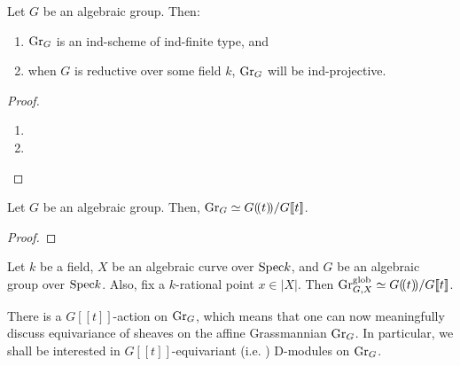                     \begin{proposition} \label{prop: structure_of_affine_grasmannian}
                        Let $G$ be an algebraic group. Then:
                            \begin{enumerate}
                                \item $\mathrm{Gr}_G$ is an ind-scheme of ind-finite type, and
                                \item when $G$ is reductive over some field $k$, $\mathrm{Gr}_G$ will be ind-projective.
                            \end{enumerate}
                    \end{proposition}
                        \begin{proof}
                            \noindent
                            \begin{enumerate}
                                \item 
                                \item 
                            \end{enumerate}
                        \end{proof}
                        
                    \begin{proposition} \label{prop: affine_grassmannians_as_coset_spaces}
                        Let $G$ be an algebraic group. Then, $\mathrm{Gr}_G \simeq G(\!(t)\!)/G[\![t]\!]$.
                    \end{proposition}
                        \begin{proof}
                            
                        \end{proof}
                    \begin{corollary}
                        Let $k$ be a field, $X$ be an algebraic curve over $\mathrm{Spec} k$, and $G$ be an algebraic group over $\mathrm{Spec} k$. Also, fix a $k$-rational point $x \in |X|$. Then $\mathrm{Gr}_{G, X}^{\mathrm{glob}} \simeq G(\!(t)\!)/G[\![t]\!]$.
                    \end{corollary}
                    \begin{corollary} \label{coro: loop_group_action_on_grassmannians}
                        There is a $G[\![t]\!]$-action on $\mathrm{Gr}_G$, which means that one can now meaningfully discuss equivariance of sheaves on the affine Grassmannian $\mathrm{Gr}_G$. In particular, we shall be interested in $G[\![t]\!]$-equivariant (i.e. ) D-modules on $\mathrm{Gr}_G$.
                    \end{corollary}
                    
